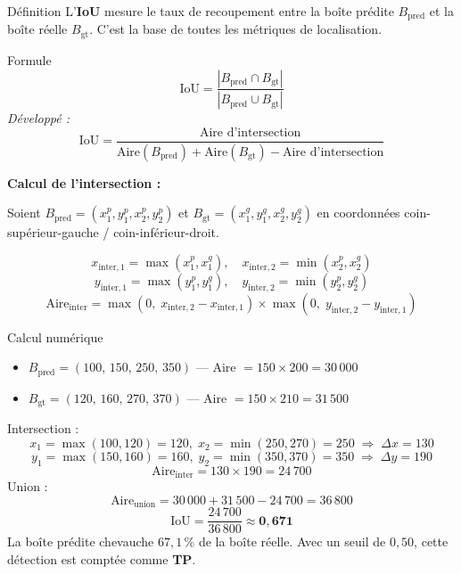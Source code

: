 \documentclass[12pt, a4paper]{report}
\newcommand{\IoU}{\text{IoU}}
\begin{document}
\begin{definitionbox}{Définition}
  L'\textbf{IoU} mesure le taux de recoupement entre la boîte prédite
  $B_{\text{pred}}$ et la boîte réelle $B_{\text{gt}}$. C'est la base de toutes
  les métriques de localisation.
\end{definitionbox}

\begin{formulebox}{Formule}
  \[
    \IoU = \frac{\left|B_{\text{pred}} \cap B_{\text{gt}}\right|}
                {\left|B_{\text{pred}} \cup B_{\text{gt}}\right|}
  \]
  \textit{Développé :}
  \[
    \IoU = \frac{\text{Aire d'intersection}}
                {\text{Aire}(B_{\text{pred}}) + \text{Aire}(B_{\text{gt}}) - \text{Aire d'intersection}}
  \]
\end{formulebox}

\textbf{Calcul de l'intersection :}

Soient $B_{\text{pred}} = (x_1^p, y_1^p, x_2^p, y_2^p)$ et
$B_{\text{gt}} = (x_1^g, y_1^g, x_2^g, y_2^g)$ en coordonnées
coin-supérieur-gauche / coin-inférieur-droit.

\[
  x_{\text{inter},1} = \max(x_1^p, x_1^g), \quad
  x_{\text{inter},2} = \min(x_2^p, x_2^g)
\]
\[
  y_{\text{inter},1} = \max(y_1^p, y_1^g), \quad
  y_{\text{inter},2} = \min(y_2^p, y_2^g)
\]
\[
  \text{Aire}_{\text{inter}} =
    \max(0,\; x_{\text{inter},2} - x_{\text{inter},1}) \times
    \max(0,\; y_{\text{inter},2} - y_{\text{inter},1})
\]

\begin{examplebox}{Calcul numérique}
  \begin{itemize}
    \item $B_{\text{pred}} = (100,\,150,\,250,\,350)$ — Aire $= 150 \times 200 = 30\,000$
    \item $B_{\text{gt}} = (120,\,160,\,270,\,370)$ — Aire $= 150 \times 210 = 31\,500$
  \end{itemize}

  Intersection :
  \[
    x_1 = \max(100,120)=120,\; x_2 = \min(250,270)=250 \;\Rightarrow\; \Delta x = 130
  \]
  \[
    y_1 = \max(150,160)=160,\; y_2 = \min(350,370)=350 \;\Rightarrow\; \Delta y = 190
  \]
  \[
    \text{Aire}_{\text{inter}} = 130 \times 190 = 24\,700
  \]
  Union :
  \[
    \text{Aire}_{\text{union}} = 30\,000 + 31\,500 - 24\,700 = 36\,800
  \]
  \[
    \IoU = \frac{24\,700}{36\,800} \approx \mathbf{0{,}671}
  \]
  La boîte prédite chevauche $67{,}1\,\%$ de la boîte réelle.
  Avec un seuil de $0{,}50$, cette détection est comptée comme \textbf{TP}.
\end{examplebox}
\end{document}
